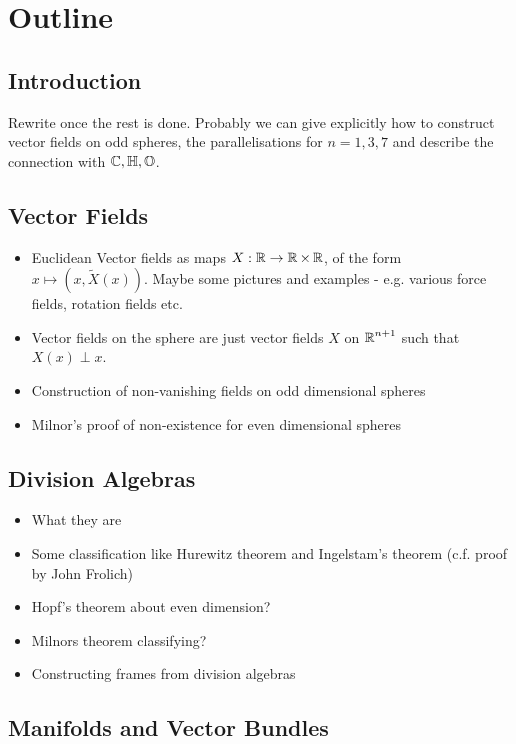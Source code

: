 \section{Outline}

\subsection{Introduction}

Rewrite once the rest is done. Probably we can give explicitly how to construct vector fields on odd spheres, the parallelisations for $n=1,3,7$ and describe the connection with $\operatorname{\mathbb{C}}, \operatorname{\mathbb{H}}, \operatorname{\mathbb{O}}$.

\subsection{Vector Fields}

\begin{itemize}
\item Euclidean Vector fields as maps \(X : \operatorname{\mathbb{R}} \to \operatorname{\mathbb{R}} \times \operatorname{\mathbb{R}}\), of the form \(x \mapsto (x, \tilde{X}(x))\). Maybe some pictures and examples - e.g. various force fields, rotation fields etc.
\item Vector fields on the sphere are just vector fields \(X\) on \(\operatorname{\mathbb{R}}^{n+1}\) such that \(X(x) \perp x\).
\item Construction of non-vanishing fields on odd dimensional spheres
\item Milnor's proof of non-existence for even dimensional spheres
\end{itemize}

\subsection{Division Algebras}

\begin{itemize}
\item What they are
\item Some classification like Hurewitz theorem and Ingelstam's theorem (c.f. proof by John Frolich)
\item Hopf's theorem about even dimension?
\item Milnors theorem classifying?
\item Constructing frames from division algebras
\end{itemize}

\subsection{Manifolds and Vector Bundles}

